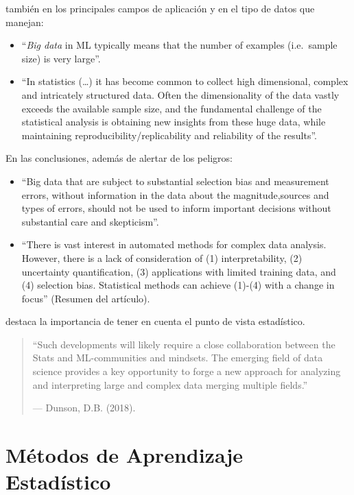 \documentclass[
]{book}
\theoremstyle{break}
\theoremstyle{nonumberplain}
\begin{document}
también en los principales campos de aplicación y en el tipo de datos que manejan:

\begin{itemize}
\item
  ``\emph{Big data} in ML typically means that the number of examples (i.e.~sample size) is very large''.
\item
  ``In statistics (\ldots) it has become common to collect high dimensional, complex and intricately structured data. Often the dimensionality of the data vastly exceeds the available sample size, and the fundamental challenge of the statistical analysis is obtaining new insights from these huge data, while maintaining reproducibility/replicability and reliability of the results''.
\end{itemize}

En las conclusiones, además de alertar de los peligros:

\begin{itemize}
\item
  ``Big data that are subject to substantial selection bias and measurement errors, without information in the data about the magnitude,sources and types of errors, should not be used to inform important decisions without substantial care and skepticism''.
\item
  ``There is vast interest in automated methods for complex data analysis. However, there is a lack of consideration of (1) interpretability, (2) uncertainty quantification, (3) applications with limited training data, and (4) selection bias. Statistical methods can achieve (1)-(4) with a change in focus'' (Resumen del artículo).
\end{itemize}

destaca la importancia de tener en cuenta el punto de vista estadístico.

\begin{quote}
``Such developments will likely require a close collaboration between the Stats and ML-communities and mindsets. The emerging field of data science provides a key opportunity to forge a new approach for analyzing and interpreting large and complex data merging multiple fields.''

--- Dunson, D.B.
(2018).
\end{quote}

\hypertarget{muxe9todos-de-aprendizaje-estaduxedstico}{%
\section{Métodos de Aprendizaje Estadístico}\label{muxe9todos-de-aprendizaje-estaduxedstico}}
\end{document}
